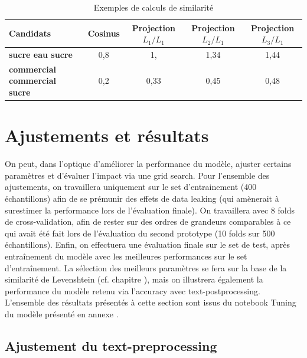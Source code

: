             \begin{table}[hbtp]
            \begin{center}
            \begin{small}
            \begin{tabular}{lcccc}
                \toprule
                \textbf{Candidats} &  \textbf{Cosinus} &  \textbf{Projection $L_{1}/L_{1}$} & \textbf{Projection $L_{2}/L_{1}$} & \textbf{Projection $L_{3}/L_{1}$}\\
                \midrule
                \textbf{sucre eau sucre} &  0,8 & 1, & 1,34 & 1,44 \\
                \textbf{commercial commercial sucre} & 0,2 & 0,33 & 0,45 & 0,48 \\
                \bottomrule
            \end{tabular}
            \end{small}
            \caption{Exemples de calculs de similarité}
            \label{tbl:similarites_exemples}
            \end{center}
            \end{table}

    \section{Ajustements et résultats}
            
    On peut, dans l'optique d'améliorer la performance du modèle, ajuster certains paramètres et d'évaluer l'impact via une grid search.
    Pour l'ensemble des ajustements, on travaillera uniquement sur le set d'entrainement (400 échantillons) afin de se prémunir des effets de data leaking (qui amènerait à surestimer la performance lors de l'évaluation finale).
    On travaillera avec 8 folds de cross-validation, afin de rester sur des ordres de grandeurs comparables à ce qui avait été fait lors de l'évaluation du second prototype (10 folds sur 500 échantillons).
    Enfin, on effectuera une évaluation finale sur le set de test, après entraînement du modèle avec les meilleures performances sur le set d'entraînement.
    La sélection des meilleurs paramètres se fera sur la base de la similarité de Levenshtein (cf. chapitre ), mais on illustrera également la performance du modèle retenu via l'accuracy avec text-postprocessing.
    L'ensemble des résultats présentés à cette section sont issus du notebook \og Tuning du modèle \fg présenté en annexe .

        \subsection{Ajustement du text-preprocessing}


